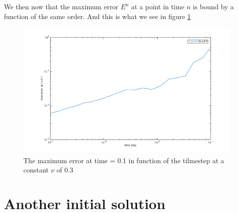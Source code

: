 \documentclass[ twoside,openright,titlepage,numbers=noenddot,headinclude,%
                footinclude=true,cleardoublepage=empty,abstractoff, %
                BCOR=5mm,paper=a4,fontsize=11pt,%
                ngerman,american,%
                ]{scrreprt}
\begin{document}
We then now that the maximum error $E^n$ at a point in time $n$ is bound by a function of the same order. And this is what we see in figure \ref{errororrrTransport}

\begin{figure}[htbp] %
   \centering
   \includegraphics[width=15cm]{images/errororrrTransport} 
   \caption{The maximum error at time = 0.1 in function of the tilmestep at a constant $\nu$ of 0.3 }
   \label{errororrrTransport}
\end{figure}




\section{Another initial solution}
\end{document}
